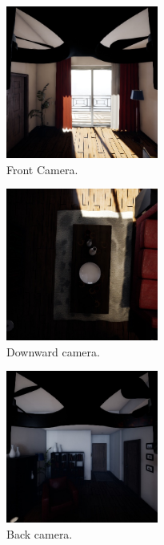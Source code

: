 \begin{figure}[!htb]
    \centering
    \begin{subfigure}{0.32\textwidth}
    \centering
        \includegraphics[height=5cm]{rapport/fig/Results/single/forward_center.jpeg}
        \caption{Front Camera.}
        \label{fig:res_original_front}
    \end{subfigure}
    \begin{subfigure}{0.32\textwidth}
        \centering
        \includegraphics[height=5cm]{rapport/fig/Results/single/down_center.jpeg}
        \caption{Downward camera.}
        \label{fig:res_original_down}
    \end{subfigure}    
    \begin{subfigure}{0.32\textwidth}
        \centering
        \includegraphics[height=5cm]{rapport/fig/Results/single/backward_center.jpeg}
        \caption{Back camera.}
        \label{fig:res_original_back}
    \end{subfigure} \\[0.75ex]
    \begin{subfigure}{0.32\textwidth}

\end{subfigure}
\end{figure}
